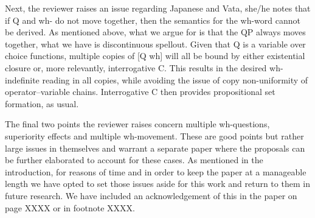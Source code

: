\documentclass[11pt]{article}
\begin{document}
Next, the reviewer raises an issue regarding  Japanese and Vata, she/he notes that if Q and wh- do not move together, then the semantics for the wh-word cannot be derived. As mentioned above, what we argue for is that the QP always moves together, what we have is discontinuous spellout. Given that Q is a variable over choice functions, multiple copies of [Q wh] will all be bound by either existential closure or, more relevantly, interrogative C. This results in the desired wh-indefinite reading in all copies, while avoiding the issue of copy non-uniformity of operator--variable chains. Interrogative C then provides propositional set formation, as usual.




\newpage




The final two points the reviewer raises concern multiple wh-questions, superiority effects and multiple wh-movement. These are good points but  rather large issues in themselves and warrant a separate paper where the proposals can be further elaborated to account for these cases. As mentioned in the introduction, for reasons of time and in order to keep the paper at a manageable length we have opted to set those issues aside for this work and return to them in future research. We have included an acknowledgement of this in the paper on page XXXX or in footnote XXXX.
\end{document}
